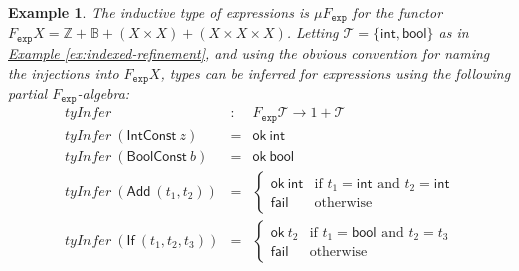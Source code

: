 \documentclass{LMCS}
\newcommand{\tyname}[1]{\texttt{#1}}
\newcommand{\ok}{\mathsf{ok}}
\newtheorem{eorollary}{Example}
\begin{document}
\begin{eorollary} The inductive type of expressions is $\mu
  F_{\tyname{exp}}$ for the functor $F_{\tyname{exp}}X = \mathbb{Z} +
  \mathbb{B} + (X \times X) + (X \times X \times X)$.  Letting
  $\mathcal{T} = \{ \mathsf{int}, \mathsf{bool} \}$ as in
  \hyperref[ex:indexed-refinement]{Example
    \ref*{ex:indexed-refinement}}, and using the obvious convention
  for naming the injections into $F_{\tyname{exp}}X$, types can be
  inferred for expressions using the following partial
  $F_{\tyname{exp}}$-algebra:
\begin{displaymath}
  \begin{array}{lcl}
    \mathit{tyInfer} & : & F_{\tyname{exp}}\mathcal{T} \to 1 + \mathcal{T} \\
    \mathit{tyInfer}\ (\mathsf{IntConst}\ z) &=& \ok\ \mathsf{int} \\
    \mathit{tyInfer}\ (\mathsf{BoolConst}\ b) &=& \ok\ \mathsf{bool} \\
    \mathit{tyInfer}\ (\mathsf{Add}\ (t_1, t_2)) &=&
    \left\{
      \begin{array}{ll}
        \ok\ \mathsf{int} &
        \textrm{if }t_1 = \mathsf{int}\textrm{ and }t_2 = \mathsf{int} \\
        \mathsf{fail} & \textrm{otherwise}
      \end{array}
    \right. \\
    \mathit{tyInfer}\ (\mathsf{If}\ (t_1,t_2,t_3)) &=&
    \left\{
      \begin{array}{ll}
        \ok\ t_2 &
          \textrm{if }t_1 = \mathsf{ bool } \textrm{ and }t_2 = t_3\\
        \mathsf{fail} & \textrm{otherwise}
      \end{array}
    \right.
  \end{array}
\end{displaymath}
\end{eorollary}
\end{document}
